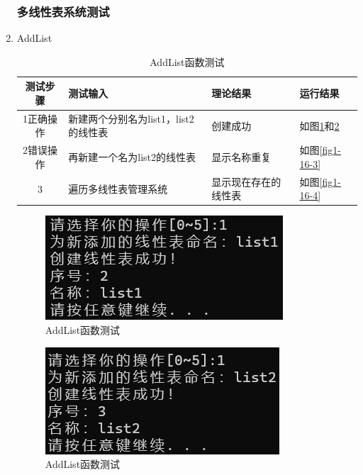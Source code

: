 \documentclass[supercite]{Experimental_Report}
\theoremstyle{definition}
\begin{document}
\begin{enumerate}
\subsubsection{多线性表系统测试}
	\item AddList
	\begin{table}[h!]
		\begin{center}
			\caption{AddList函数测试}
			\begin{tabular}{|c|p{4cm}<{\centering}|p{4cm}<{\centering}|p{4cm}<{\centering}|} 
				\hline
				\textbf{测试步骤} & \textbf{测试输入} & \textbf{理论结果} & \textbf{运行结果} \\
				\hline
				1正确操作 & 新建两个分别名为list1，list2的线性表 &创建成功 &如图\ref{fig1-16-1}和\ref{fig1-16-2}\\
				\hline
				2错误操作 & 再新建一个名为list2的线性表 &显示名称重复 &如图\ref{fig1-16-3}\\
				\hline
				3 & 遍历多线性表管理系统 &显示现在存在的线性表 &如图\ref{fig1-16-4}\\
				\hline
			\end{tabular}
		\end{center}
	\end{table}
	\begin{figure}[H] %
		\begin{center}
			\includegraphics[width=0.5\linewidth]{images/linklist/19-1-1.png}
			\caption{ AddList函数测试}
			\label{fig1-16-1}
		\end{center}
	\end{figure}
\begin{figure}[H] %
	\begin{center}
		\includegraphics[width=0.5\linewidth]{images/linklist/19-1-3.png}
		\caption{ AddList函数测试}
		\label{fig1-16-2}
	\end{center}
\end{figure}

\end{enumerate}
\end{document}
